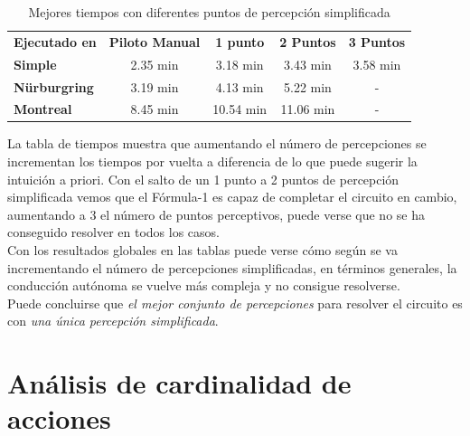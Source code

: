 \begin{table}[ht!]
\centering
\begin{tabular}{|l|c|c|c|c|}
\hline
\rowcolor[HTML]{EFEFEF} 
\multicolumn{5}{|c|}{\cellcolor[HTML]{EFEFEF}\textbf{Mejor tiempo / Percepciones}}                                               \\ \hline
\rowcolor[HTML]{EFEFEF} 
\textbf{Ejecutado en}                        & \textbf{Piloto Manual} & \textbf{1 punto} & \textbf{2 Puntos} & \textbf{3 Puntos} \\ \hline
\cellcolor[HTML]{EFEFEF}\textbf{Simple}      & 2.35 min               & 3.18 min         & 3.43 min          & 3.58 min          \\ \hline
\cellcolor[HTML]{EFEFEF}\textbf{Nürburgring} & 3.19 min               & 4.13 min         & 5.22 min          & -                 \\ \hline
\cellcolor[HTML]{EFEFEF}\textbf{Montreal}    & 8.45 min               & 10.54 min        & 11.06 min         & -                 \\ \hline
\end{tabular}
\caption{Mejores tiempos con diferentes puntos de percepción simplificada}
\label{tab:tiempos_percepciones}
\end{table}

La tabla de tiempos muestra que aumentando el número de percepciones se incrementan los tiempos por vuelta a diferencia de lo que puede sugerir la intuición a priori. Con el salto de un 1 punto a 2 puntos de percepción simplificada vemos que el Fórmula-1 es capaz de completar el circuito en cambio, aumentando a 3 el número de puntos perceptivos, puede verse que no se ha conseguido resolver en todos los casos.\\

Con los resultados globales en las tablas puede verse cómo según se va incrementando el número de percepciones simplificadas, en términos generales, la conducción autónoma se vuelve más compleja y no consigue resolverse.\\

Puede concluirse que \textit{el mejor conjunto de percepciones} para resolver el circuito es con \textit{una única percepción simplificada}.

\section{Análisis de cardinalidad de acciones}

